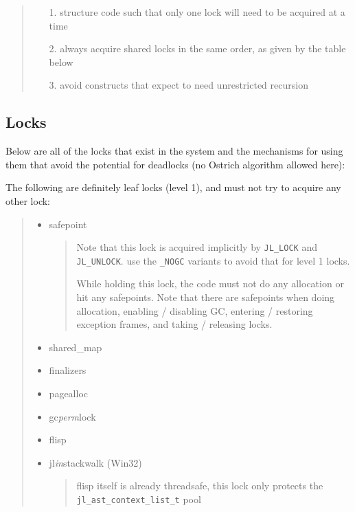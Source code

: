 \begin{quote}
\begin{itemize}
\item[1. ] structure code such that only one lock will need to be acquired at a time


\item[2. ] always acquire shared locks in the same order, as given by the table below


\item[3. ] avoid constructs that expect to need unrestricted recursion

\end{itemize}
\end{quote}


\hypertarget{13071695811965191352}{}


\subsection{Locks}



Below are all of the locks that exist in the system and the mechanisms for using them that avoid the potential for deadlocks (no Ostrich algorithm allowed here):



The following are definitely leaf locks (level 1), and must not try to acquire any other lock:



\begin{quote}
\begin{itemize}
\item safepoint

\begin{quote}
Note that this lock is acquired implicitly by \texttt{JL\_LOCK} and \texttt{JL\_UNLOCK}. use the \texttt{\_NOGC} variants to avoid that for level 1 locks.

While holding this lock, the code must not do any allocation or hit any safepoints. Note that there are safepoints when doing allocation, enabling / disabling GC, entering / restoring exception frames, and taking / releasing locks.

\end{quote}

\item shared\_map


\item finalizers


\item pagealloc


\item gc\emph{perm}lock


\item flisp


\item jl\emph{in}stackwalk (Win32)

\begin{quote}
flisp itself is already threadsafe, this lock only protects the \texttt{jl\_ast\_context\_list\_t} pool

\end{quote}
\end{itemize}
\end{quote}


